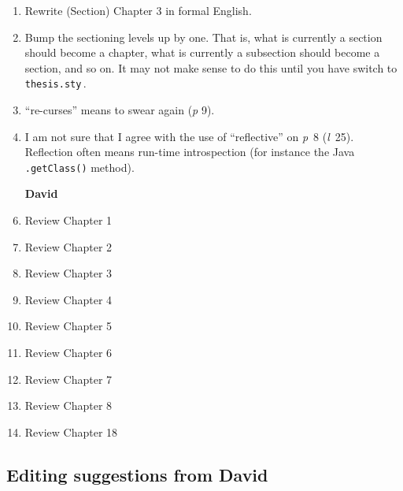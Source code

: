 \begin{scope}
\begin{enumerate}
  The \Verb!\paragraph! command is in the same family as \Verb!chapter!,
  \Verb!\section!, and so on.  For its correct use, see later in this
  file.

  If you don't like the shape of the paragraphs that you get without
  \Verb!paragraph!, use something like
  \begin{Verbatim}
\setlength{\parindent}{3em}
\setlength{\parskip}{2\baselineskip}
  \end{Verbatim}
  to adjust either the initial paragraph indent, or the inter-paragraph
  space.

\item
  Rewrite (Section) Chapter 3 in formal English.

\item
  Bump the sectioning levels up by one.  That is, what is currently a
  section should become a chapter, what is currently a subsection should
  become a section, and so on.  It may not make sense to do this until
  you have switch to \Verb!thesis.sty!\,.

\item
  ``re-curses'' means to swear again (\textit{p} 9).
\item
  I am not sure that I agree with the use of ``reflective'' on
  \textit{p}~8 (\textit{l}~25).  Reflection often means run-time
  introspection (for instance the Java \Verb!.getClass()! method).
  
\item [\textbf{David}]
\item Review Chapter 1
\item Review Chapter 2
\item Review Chapter 3
\item Review Chapter 4
\item Review Chapter 5
\item Review Chapter 6
\item Review Chapter 7
\item Review Chapter 8
\item Review Chapter 18

\end{enumerate}

\subsection{Editing suggestions from David}\label{sec:edit-sugg-david}


\end{scope}

